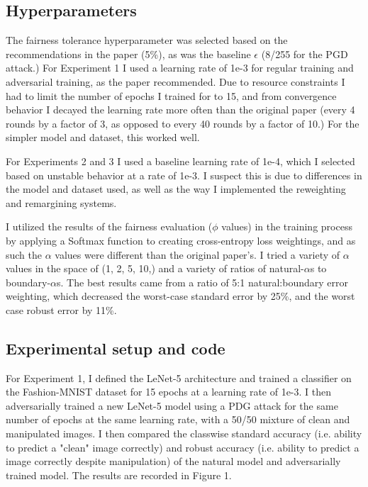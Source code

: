\subsection{Hyperparameters}
The fairness tolerance hyperparameter was selected based on the recommendations in the paper (5\%), as was the baseline $\epsilon$ (8/255 for the PGD attack.) For Experiment 1 I used a learning rate of 1e-3 for regular training and adversarial training, as the paper recommended. Due to resource constraints I had to limit the number of epochs I trained for to 15, and from convergence behavior I decayed the learning rate more often than the original paper (every 4 rounds by a factor of 3, as opposed to every 40 rounds by a factor of 10.) For the simpler model and dataset, this worked well.

For Experiments 2 and 3 I used a baseline learning rate of 1e-4, which I selected based on unstable behavior at a rate of 1e-3. I suspect this is due to differences in the model and dataset used, as well as the way I implemented the reweighting and remargining systems. 

I utilized the results of the fairness evaluation  ($\phi$ values) in the training process by applying a Softmax function to creating cross-entropy loss weightings, and as such the $\alpha$ values were different than the original paper's. I tried a variety of $\alpha$ values in the space of (1, 2, 5, 10,) and a variety of ratios of natural-$\alpha$s to boundary-$\alpha$s. The best results came from a ratio of 5:1 natural:boundary error weighting, which decreased the worst-case standard error by 25\%, and the worst case robust error by 11\%. 

\subsection{Experimental setup and code}
For Experiment 1, I defined the LeNet-5 architecture and trained a classifier on the Fashion-MNIST dataset for 15 epochs at a learning rate of 1e-3. I then adversarially trained a new LeNet-5 model using a PDG attack for the same number of epochs at the same learning rate, with a 50/50 mixture of clean and manipulated images. I then compared the classwise standard accuracy (i.e. ability to predict a "clean" image correctly) and robust accuracy (i.e. ability to predict a image correctly despite manipulation) of the natural model and adversarially trained model. The results are recorded in Figure 1. 

